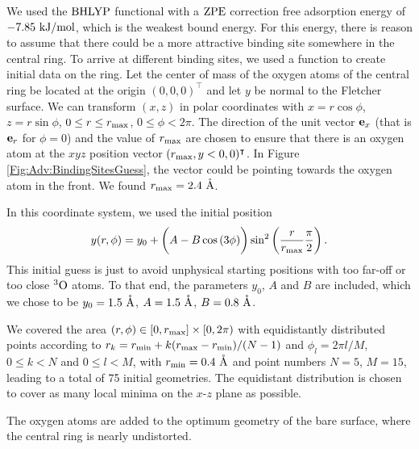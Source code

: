We used the $\text{BHLYP}$ functional with a $\text{ZPE}$ correction free adsorption energy 
of $-7.85~\text {kJ/mol}$, which is the weakest bound energy. For this energy,
there is reason to assume that there could be a more attractive binding site
somewhere in the central ring. To arrive at different binding sites, we used
a function to create initial data on the ring. Let the center of mass of the oxygen
atoms of the central ring be located at the origin $(0,0,0)^{\intercal}$ and let $y$ be
normal to the Fletcher surface. We can transform $(x,z)$ in polar coordinates with
$x=r \cos \phi$, $z=r \sin\phi$, $0 \leq r \leq r_{\text{max}}$, $0 \leq \phi<2\pi$. The direction of the
unit vector $\mathbf{e}_x$ (that is $\mathbf{e}_r$ for $\phi=0$) and the value of $r_{\text{max}}$ are
chosen to ensure that there is an oxygen atom at the $xyz$ position
vector \mbox{$(r_{\text{max}},y < 0,0)^{\intercal}$}. In Figure
\ref{Fig:Adv:BindingSitesGuess}, the vector could be pointing towards the oxygen
atom in the front. We found $r_{\text{max}}=2.4~\mathring{\text{A}}$.

In this coordinate system, we used the initial position
\begin{equation}
 y(r,\phi)=y_0+\left({\vphantom{\frac 1 2}  A-B\cos\left({3\phi}\right)}\right) \sin^2\left({\frac{r}{r_{\text{max}}}\frac\pi 2 }\right).
 \label{Adv:InitPos}
\end{equation}
This initial guess is
just to avoid unphysical starting positions with too far-off or too close ${^3\text{O}}$
atoms. To that end, the parameters $y_0$, $A$ and $B$ are included, which we chose to be
$y_0=1.5~\mathring{\text{A}}$, $A=1.5~\mathring{\text{A}}$, $B=0.8~\mathring{\text{A}}$.

We covered the area $(r,\phi) \in [0,r_{\text{max}}] \times [0, 2\pi)$ with equidistantly
distributed points according to $r_k=r_{\text{min}}+k(r_{\text{max}}-r_{\text{min}})/(N-1)$ and $\phi_l=2\pi l/M$,
$0 \leq k < N$ and $0 \leq l < M$, with $r_{\text{min}}=0.4~\mathring{\text{A}}$ and point numbers
$N=5$, $M=15$, leading to a total of 75 initial geometries. The equidistant
distribution is chosen to cover as many local minima on the $x$-$z$ plane as
possible.

The oxygen atoms are added to the optimum geometry of the bare surface, where
the central ring is nearly undistorted.

